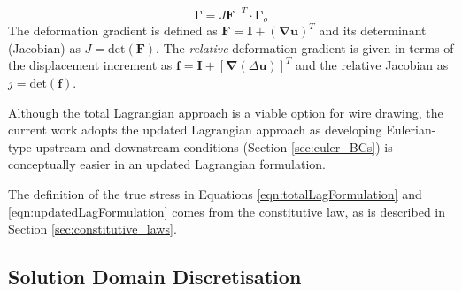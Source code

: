 \documentclass[sn-mathphys,Numbered]{sn-jnl}%
\newcommand{\bb}{\boldsymbol}
\begin{document}
\begin{equation}
    \bb{\Gamma} = J\bb{F}^{-T}\cdot\bb{\Gamma}_o
\end{equation}
The deformation gradient is defined as $\bb{F} = \textbf{I} + (\boldsymbol{\nabla} \boldsymbol{u})^T$ and its determinant (Jacobian) as $J = \text{det}(\boldsymbol{F})$.
The \emph{relative} deformation gradient is given in terms of the displacement increment as $\bb{f}=\textbf{I} + \left[\bb{\nabla}(\Delta \bb{u}) \right]^T$ and the relative Jacobian as $j = \text{det}(\bb{f})$.

Although the total Lagrangian approach is a viable option for wire drawing, the current work adopts the updated Lagrangian approach as developing Eulerian-type upstream and downstream conditions (Section \ref{sec:euler_BCs}) is conceptually easier in an updated Lagrangian formulation.

The definition of the true stress in Equations \ref{eqn:totalLagFormulation} and \ref{eqn:updatedLagFormulation} comes from the constitutive law, as is described in Section \ref{sec:constitutive_laws}.


\subsection{Solution Domain Discretisation} \label{sec:solDomDiscret}

\end{document}
